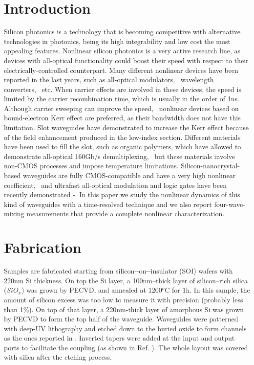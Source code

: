 \documentclass[conference]{IEEEtran}
\begin{document}
\section{Introduction}
Silicon photonics is a technology that is becoming competitive with alternative technologies in photonics, being its high integrability and low cost the most appealing features. Nonlinear silicon photonics is a very active research line, as devices with all-optical functionality could boost their speed with respect to their electrically-controlled counterpart. Many different nonlinear devices have been reported in the last years, such as all-optical modulators,~\cite{1} wavelength converters,~\cite{2} etc. When carrier effects are involved in these devices, the speed is limited by the carrier recombination time, which is usually in the order of 1ns. Although carrier sweeping can improve the speed,~\cite{3} nonlinear devices based on bound-electron Kerr effect are preferred, as their bandwidth does not have this limitation. Slot waveguides have demonstrated to increase the Kerr effect because of the field enhancement produced in the low-index section. Different materials have been used to fill the slot, such as organic polymers, which have allowed to demonstrate all-optical 160Gb/s demultiplexing,~\cite{4} but these materials involve non-CMOS processes and impose temperature limitations. Silicon-nanocrystal-based waveguides are fully CMOS-compatible and have a very high nonlinear coefficient,~\cite{5} and ultrafast all-optical modulation and logic gates have been recently demonstrated \cite{6}-\cite{7}. In this paper we study the nonlinear dynamics of this kind of waveguides with a time-resolved technique and we also report four-wave-mixing measurements that provide a complete nonlinear characterization.


\section{Fabrication}
Samples are fabricated starting from silicon‑-on‑-insulator (SOI) wafers with 220nm Si thickness. On top the Si layer, a 100nm--thick layer of silicon--rich silica ($ SiO_x $) was grown by PECVD, and annealed at 1200$^o$C for 1h. In this sample, the amount of silicon excess was too low to measure it with precision (probably less than 1\%). On top of that layer, a 220nm-thick layer of amorphous Si was grown by PECVD to form the top half of the waveguide. Waveguides were patterned with deep-UV lithography and etched down to the buried oxide to form channels as the ones reported in \cite{6}. Inverted tapers were added at the input and output ports to facilitate the coupling (as shown in Ref. \cite{Bakir}). The whole layout was covered with silica after the etching process.  
\end{document}
